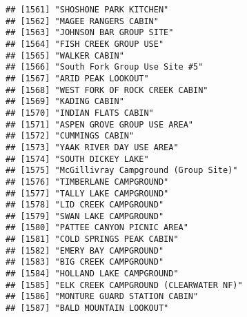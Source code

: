\documentclass[
]{article}
\begin{document}
\begin{verbatim}
## [1561] "SHOSHONE PARK KITCHEN"                                                               
## [1562] "MAGEE RANGERS CABIN"                                                                 
## [1563] "JOHNSON BAR GROUP SITE"                                                              
## [1564] "FISH CREEK GROUP USE"                                                                
## [1565] "WALKER CABIN"                                                                        
## [1566] "South Fork Group Use Site #5"                                                        
## [1567] "ARID PEAK LOOKOUT"                                                                   
## [1568] "WEST FORK OF ROCK CREEK CABIN"                                                       
## [1569] "KADING CABIN"                                                                        
## [1570] "INDIAN FLATS CABIN"                                                                  
## [1571] "ASPEN GROVE GROUP USE AREA"                                                          
## [1572] "CUMMINGS CABIN"                                                                      
## [1573] "YAAK RIVER DAY USE AREA"                                                             
## [1574] "SOUTH DICKEY LAKE"                                                                   
## [1575] "McGillivray Campground (Group Site)"                                                 
## [1576] "TIMBERLANE CAMPGROUND"                                                               
## [1577] "TALLY LAKE CAMPGROUND"                                                               
## [1578] "LID CREEK CAMPGROUND"                                                                
## [1579] "SWAN LAKE CAMPGROUND"                                                                
## [1580] "PATTEE CANYON PICNIC AREA"                                                           
## [1581] "COLD SPRINGS PEAK CABIN"                                                             
## [1582] "EMERY BAY CAMPGROUND"                                                                
## [1583] "BIG CREEK CAMPGROUND"                                                                
## [1584] "HOLLAND LAKE CAMPGROUND"                                                             
## [1585] "ELK CREEK CAMPGROUND (CLEARWATER NF)"                                                
## [1586] "MONTURE GUARD STATION CABIN"                                                         
## [1587] "BALD MOUNTAIN LOOKOUT"                                                               

\end{verbatim}
\end{document}

